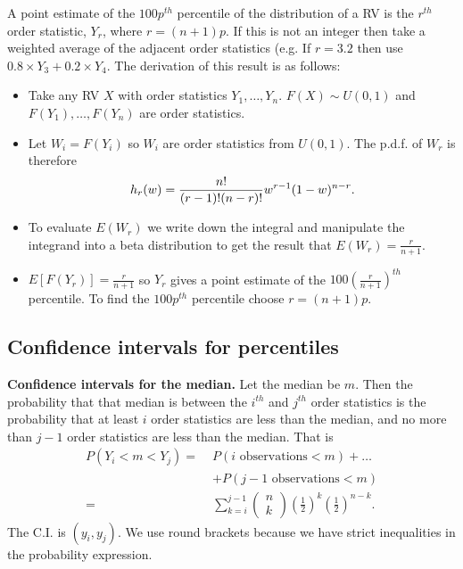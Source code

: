 \documentclass[10pt, two column]{article}
\begin{document}
A point estimate of the $100p^{th}$ percentile of the distribution of a RV is the $r^{th}$ order statistic, $Y_{r}$, where $r = (n+1)p$. If this is not an integer then take a weighted average of the adjacent order statistics (e.g. If $r = 3.2$ then use $0.8 \times Y_{3} + 0.2 \times Y_{4}$. The derivation of this result is as follows:
\begin{itemize}
\item Take any RV $X$ with order statistics $Y_{1}, \dots, Y_{n}$. $F(X) \sim U(0,1)$ and $F(Y_{1}), \dots, F(Y_{n})$ are order statistics. 
\item Let $W_{i} = F(Y_{i})$ so $W_{i}$ are order statistics from $U(0,1)$. The p.d.f. of $W_{r}$ is therefore \vspace{-6pt}
\[ 
h_{r}(w) = \frac{n!}{(r-1)!(n-r)!}w^{r-1}(1-w)^{n-r}. \vspace{-6pt}
\]
\item To evaluate $E(W_{r})$ we write down the integral and manipulate the integrand into a beta distribution to get the result that $E(W_{r}) = \frac{r}{n+1}$. 
\item  $E[F(Y_{r})] = \frac{r}{n+1}$ so $Y_{r}$ gives a point estimate of the $100(\frac{r}{n+1})^{th}$ percentile. To find the $100p^{th}$ percentile choose $r = (n+1)p$. 
\end{itemize}

\subsection{Confidence intervals for percentiles}

{\bf Confidence intervals for the median.} Let the median be $m$. Then the probability that that median is between the $i^{th}$ and $j^{th}$ order statistics is the probability that at least $i$ order statistics are less than the median, and no more than $j-1$ order statistics are less than the median. That is 
\begin{align*}
P(Y_{i} < m < Y_{j}) = \; &P(i \text{ observations} < m) + \dots \\
&+ P(j-1 \text{ observations} < m)\\
= \; &\sum_{k=i}^{j-1} \left( \begin{matrix} n \\ k \end{matrix}\right) \left( \frac{1}{2} \right)^{k} \left( \frac{1}{2} \right)^{n-k}. 
\end{align*}
The C.I. is $(y_{i}, y_{j})$. We use round brackets because we have strict inequalities in the probability expression. 
\end{document}

